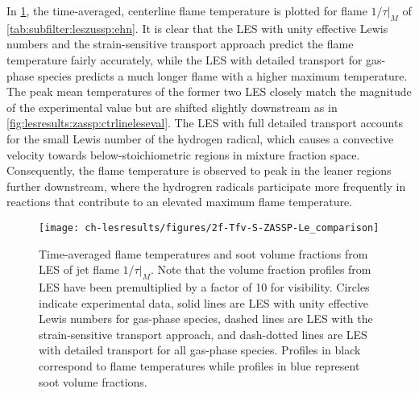 In \cref{fig:lesresults:ssta:f2lecomparison}, the time-averaged, centerline flame temperature is plotted for flame $1/\tau|_M$ of \cref{tab:subfilter:leszussp:ehn}. It is clear that the LES with unity effective Lewis numbers and the strain-sensitive transport approach predict the flame temperature fairly accurately, while the LES with detailed transport for gas-phase species predicts a much longer flame with a higher maximum temperature. The peak mean temperatures of the former two LES closely match the magnitude of the experimental value but are shifted slightly downstream as in \cref{fig:lesresults:zassp:ctrlineleseval}. The LES with full detailed transport accounts for the small Lewis number of the hydrogen radical, which causes a convective velocity towards below-stoichiometric regions in mixture fraction space. Consequently, the flame temperature is observed to peak in the leaner regions further downstream, where the hydrogren radicals participate more frequently in reactions that contribute to an elevated maximum flame temperature. %

\begin{figure}[H]
  \centering
  \texttt{[image: ch-lesresults/figures/2f-Tfv-S-ZASSP-Le\_comparison]}
  \caption[Centerline \texorpdfstring{$\langle T \rangle$}{<T>} \& \texorpdfstring{$\langle f_V \rangle$}{<fV>} from LES of Flame \texorpdfstring{$1/\tau|_M$}{1/t|M} with Various Transport Approaches]{Time-averaged flame temperatures and soot volume fractions from LES of jet flame $1/\tau|_M$. Note that the volume fraction profiles from LES have been premultiplied by a factor of 10 for visibility. Circles indicate experimental data, solid lines are LES with unity effective Lewis numbers for gas-phase species, dashed lines are LES with the strain-sensitive transport approach, and dash-dotted lines are LES with detailed transport for all gas-phase species. Profiles in black correspond to flame temperatures while profiles in blue represent soot volume fractions.}
  \label{fig:lesresults:ssta:f2lecomparison}
\end{figure}

